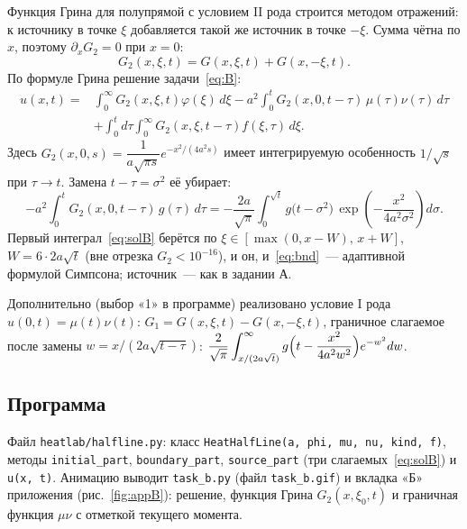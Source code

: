 \documentclass[a4paper,12pt]{article}
\newcommand{\code}[1]{\texttt{#1}}
\begin{document}
Функция Грина для полупрямой с условием II рода строится методом отражений:
к источнику в точке $\xi$ добавляется такой же источник в точке $-\xi$.
Сумма чётна по $x$, поэтому $\partial_xG_2=0$ при $x=0$:
\begin{equation}\label{eq:G2}
  G_2(x,\xi,t)=G(x,\xi,t)+G(x,-\xi,t).
\end{equation}
По формуле Грина решение задачи~\eqref{eq:B}:
\begin{equation}\label{eq:solB}
\begin{split}
  u(x,t)={}&\int_{0}^{\infty}G_2(x,\xi,t)\varphi(\xi)\,d\xi
        -a^2\!\int_{0}^{t}G_2(x,0,t-\tau)\,\mu(\tau)\nu(\tau)\,d\tau\\
        &+\int_{0}^{t}\!d\tau\int_{0}^{\infty}G_2(x,\xi,t-\tau)f(\xi,\tau)\,d\xi .
\end{split}
\end{equation}
Здесь $G_2(x,0,s)=\dfrac{1}{a\sqrt{\pi s}}e^{-x^2/(4a^2s)}$ имеет
интегрируемую особенность $1/\sqrt{s}$ при $\tau\to t$. Замена
$t-\tau=\sigma^2$ её убирает:
\begin{equation}\label{eq:bnd}
  -a^2\!\int_{0}^{t}G_2(x,0,t-\tau)\,g(\tau)\,d\tau
  =-\frac{2a}{\sqrt\pi}\int_{0}^{\sqrt t}g\bigl(t-\sigma^2\bigr)\,
   \exp\!\left(-\frac{x^2}{4a^2\sigma^2}\right)d\sigma .
\end{equation}
Первый интеграл~\eqref{eq:solB} берётся по $\xi\in[\max(0,x-W),\,x+W]$,
$W=6\cdot2a\sqrt t$ (вне отрезка $G_2<10^{-16}$), и он, и~\eqref{eq:bnd}~---
адаптивной формулой Симпсона; источник~--- как в задании А.

Дополнительно (выбор «1» в программе) реализовано условие I рода
$u(0,t)=\mu(t)\nu(t)$: $G_1=G(x,\xi,t)-G(x,-\xi,t)$, граничное слагаемое
после замены $w=x/(2a\sqrt{t-\tau})$:
$\dfrac{2}{\sqrt\pi}\displaystyle\int_{x/(2a\sqrt t)}^{\infty}
 g\Bigl(t-\frac{x^2}{4a^2w^2}\Bigr)e^{-w^2}dw$.

\subsection{Программа}

Файл \code{heatlab/halfline.py}: класс \code{HeatHalfLine(a, phi, mu, nu, kind, f)},
методы \code{initial\_part}, \code{boundary\_part}, \code{source\_part} (три
слагаемых~\eqref{eq:solB}) и \code{u(x, t)}. Анимацию выводит \code{task\_b.py}
(файл \code{task\_b.gif}) и вкладка «Б» приложения (рис.~\ref{fig:appB}): решение,
функция Грина $G_2(x,\xi_0,t)$ и граничная функция $\mu\nu$ с отметкой текущего момента.
\end{document}
